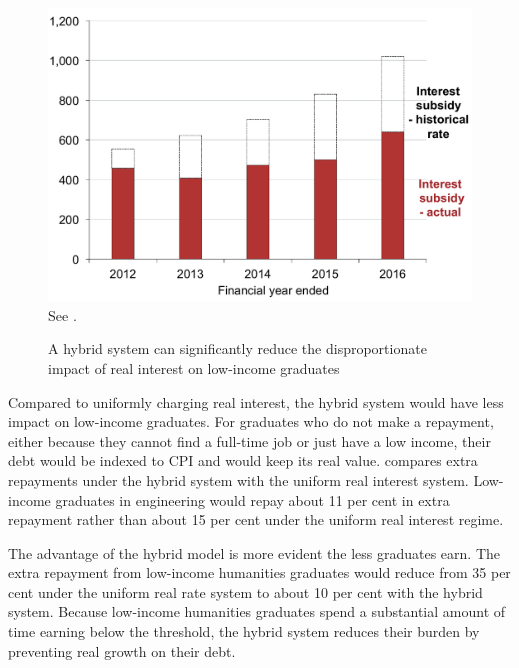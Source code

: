 \documentclass[embargoed]{grattan}
\begin{document}
\begin{figure}
\caption{A hybrid system can significantly reduce the disproportionate impact of real interest on low-income graduates}\label{fig:fig17-a-hybrid-system-can-signif-reduce-disprop-impact-of-real-interest-low-income-grads}


\includegraphics[page=17]{atlas/Chartpack.pdf}
{See .}
\end{figure}

Compared to uniformly charging real interest, the hybrid system would have less impact on low-income graduates.
For graduates who do not make a repayment, either because they cannot find a full-time job or just have a low income, their debt would be indexed to \gls{CPI} and would keep its real value.
 compares extra repayments under the hybrid system with the uniform real interest system.
Low-income graduates in engineering would repay about 11 per cent in extra repayment rather than about 15 per cent under the uniform real interest regime.

The advantage of the hybrid model is more evident the less graduates earn.
The extra repayment from low-income humanities graduates would reduce from 35 per cent under the uniform real rate system to about 10 per cent with the hybrid system.
Because low-income humanities graduates spend a substantial amount of time earning below the threshold, the hybrid system reduces their burden by preventing real growth on their debt.
\end{document}
